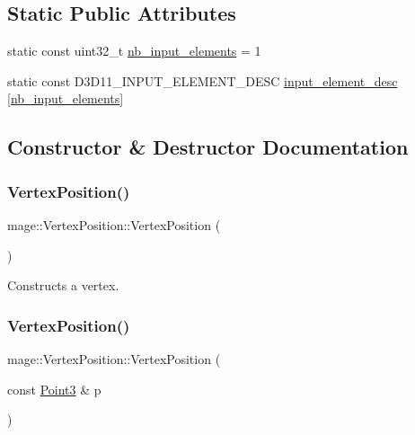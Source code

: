 \subsection*{Static Public Attributes}
\begin{DoxyCompactItemize}
\item 
static const uint32\+\_\+t \hyperlink{structmage_1_1_vertex_position_a788286b735c09aa85d855c2773d1a504}{nb\+\_\+input\+\_\+elements} = 1
\item 
static const D3\+D11\+\_\+\+I\+N\+P\+U\+T\+\_\+\+E\+L\+E\+M\+E\+N\+T\+\_\+\+D\+E\+SC \hyperlink{structmage_1_1_vertex_position_a1128c6529b1c1d7c4482e48deba46548}{input\+\_\+element\+\_\+desc} \mbox{[}\hyperlink{structmage_1_1_vertex_position_a788286b735c09aa85d855c2773d1a504}{nb\+\_\+input\+\_\+elements}\mbox{]}
\end{DoxyCompactItemize}


\subsection{Constructor \& Destructor Documentation}
\hypertarget{structmage_1_1_vertex_position_a2e6037836e67cdf5c43fc9abfa0d3753}{}\label{structmage_1_1_vertex_position_a2e6037836e67cdf5c43fc9abfa0d3753} 
\subsubsection{\texorpdfstring{Vertex\+Position()}{VertexPosition()}\hspace{0.1cm}{\footnotesize\ttfamily [1/4]}}
{\footnotesize\ttfamily mage\+::\+Vertex\+Position\+::\+Vertex\+Position (\begin{DoxyParamCaption}{ }\end{DoxyParamCaption})\hspace{0.3cm}{\ttfamily [default]}}

Constructs a vertex. \hypertarget{structmage_1_1_vertex_position_aca7867e7a2d0cb50f32283dd91bb2aed}{}\label{structmage_1_1_vertex_position_aca7867e7a2d0cb50f32283dd91bb2aed} 
\subsubsection{\texorpdfstring{Vertex\+Position()}{VertexPosition()}\hspace{0.1cm}{\footnotesize\ttfamily [2/4]}}
{\footnotesize\ttfamily mage\+::\+Vertex\+Position\+::\+Vertex\+Position (\begin{DoxyParamCaption}\item[{const \hyperlink{structmage_1_1_point3}{Point3} \&}]{p }\end{DoxyParamCaption})\hspace{0.3cm}{\ttfamily [explicit]}}

